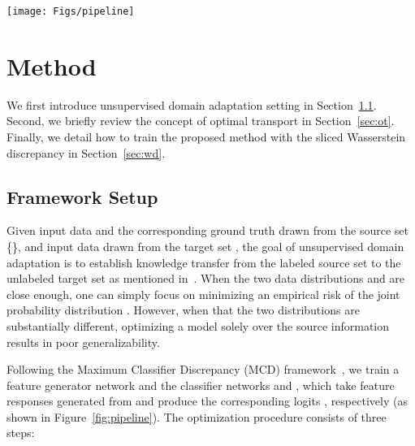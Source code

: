 \documentclass[10pt,twocolumn,letterpaper]{article}
\begin{document}
\begin{figure*}
\begin{center}
\texttt{[image: Figs/pipeline]}
\end{center}
\vspace{-5mm}
   \caption{An illustration of the proposed sliced Wasserstein discrepancy (SWD) computation. The SWD is designed to capture the dissimilarity of probability measures  and  in  between the task-specific classifiers  and , which take input from feature generator . The SWD enables end-to-end training directly through a variational formulation of Wasserstein metric using radial projections on the uniform measures on the unit sphere , providing a geometrically meaningful guidance to detect target samples that are far from the support of the source. Please refer to Section~\ref{sec:wd} for details.}
\label{fig:pipeline}
\end{figure*}


\section{Method}
We first introduce unsupervised domain adaptation setting in Section~\ref{sec:setting}. Second, we briefly review the concept of optimal transport in Section~\ref{sec:ot}. Finally, we detail how to train the proposed method with the sliced Wasserstein discrepancy in Section~\ref{sec:wd}. 

\subsection{Framework Setup}
\label{sec:setting}

Given input data  and the corresponding ground truth  drawn from the source set \{\}, and input data  drawn from the target set , the goal of unsupervised domain adaptation is to establish knowledge transfer from the labeled source set to the unlabeled target set as mentioned in~\cite{pan2010survey}.
 When the two data distributions  and  are close enough, one can simply focus on minimizing an empirical risk of the joint probability distribution . However, when that the two distributions are substantially different, optimizing a model solely over the source information results in poor generalizability.

Following the Maximum Classifier Discrepancy (MCD) framework~\cite{saito2017maximum}, we train a feature generator network  and
the classifier networks  and , which take feature responses generated from  and produce the corresponding logits ,  respectively (as shown in Figure~\ref{fig:pipeline}).
The optimization procedure consists of three steps:
\end{document}
